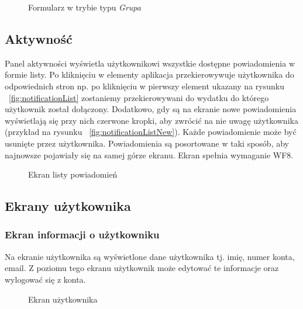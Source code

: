 \begin{figure}[h!]%
    \centering
    \caption{Formularz w trybie typu \emph{Grupa}}
\end{figure}

\clearpage
\subsection{Aktywność}
Panel aktywności wyświetla użytkownikowi wszystkie dostępne powiadomienia w formie listy. Po kliknięciu w elementy aplikacja przekierowywuje użytkownika do odpowiednich stron np. po kliknięciu w pierwszy element ukazany na rysunku ~\ref{fig:notificationList} zostaniemy przekierowywani do wydatku do którego użytkownik został dołączony. Dodatkowo, gdy są na ekranie nowe powiadomienia wyświetlają się przy nich czerwone kropki, aby zwrócić na nie uwagę użytkownika (przykład na rysunku ~\ref{fig:notificationListNew}). Każde powiadomienie może być usunięte przez użytkownika. Powiadomienia są posortowane w taki sposób, aby najnowsze pojawiały się na samej górze ekranu. Ekran spełnia wymaganie WF8.

\begin{figure}[h!]%
    \centering
    \qquad
    \caption{Ekran listy powiadomień}%
\end{figure}

\clearpage
\subsection{Ekrany użytkownika}
\subsubsection{Ekran informacji o użytkowniku}
Na ekranie użytkownika są wyświetlone dane użytkownika tj. imię, numer konta, email. Z poziomu tego ekranu użytkownik może edytować te informacje oraz wylogować się z konta.

\begin{figure}[h!]%
    \centering
    \qquad
    \caption{Ekran użytkownika}%
\end{figure}

